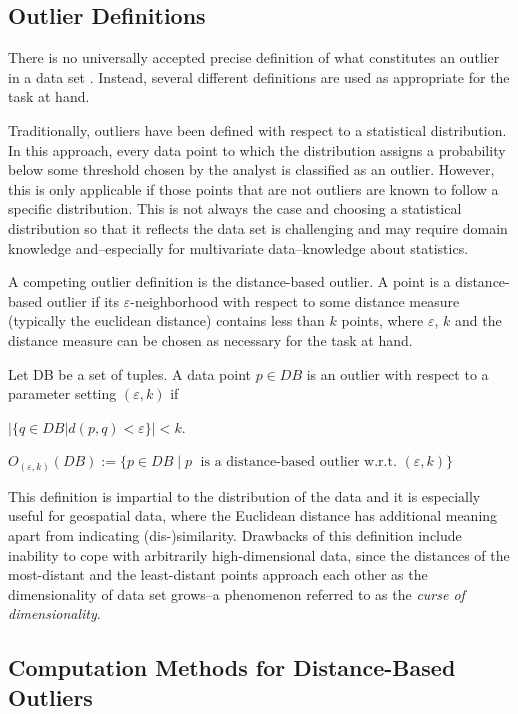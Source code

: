\documentclass[runningheads]{llncs}
\begin{document}
\subsection{Outlier Definitions}

There is no universally accepted precise definition of what constitutes an outlier in a data set \cite{kriegeldefinitions,outlier_definitions}. Instead, several different definitions are used as appropriate for the task at hand.

Traditionally, outliers have been defined with respect to a statistical distribution. In this approach, every data point to which the distribution assigns a probability below some threshold chosen by the analyst is classified as an outlier. However, this is only applicable if those points that are not outliers are known to follow a specific distribution. This is not always the case and choosing a statistical distribution so that it reflects the data set is challenging and may require domain knowledge and--especially for multivariate data--knowledge about statistics.

A competing outlier definition is the distance-based outlier. A point is a distance-based outlier if its $\varepsilon$-neighborhood with respect to some distance measure (typically the euclidean distance) contains less than $k$ points, where $\varepsilon$, $k$ and the distance measure can be chosen as necessary for the task at hand.

\begin{definition}
    Let DB be a set of tuples. A data point $p\in DB$ is an outlier with respect to a parameter setting $(\varepsilon,k)$ if

    $|\{q \in DB | d(p,q) < \varepsilon\}| < k$.

    $O_{(\varepsilon,k)}(DB) := \{p\in DB \;| \;p\;\text{ is a distance-based outlier w.r.t. }(\varepsilon,k) \}$
\end{definition}

This definition is impartial to the distribution of the data and it is especially useful for geospatial data, where the Euclidean distance has additional meaning apart from indicating (dis-)similarity. Drawbacks of this definition include inability to cope with arbitrarily high-dimensional data, since the distances of the most-distant and the least-distant points approach each other as the dimensionality of data set grows--a phenomenon referred to as the \emph{curse of dimensionality}\cite{curse_of_dimensionality}.
\subsection{Computation Methods for Distance-Based Outliers}
\end{document}
